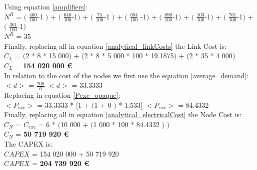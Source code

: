 Using equation \ref{amplifiers}:\\

$N^R$ = $($ $\frac{460}{100}$-1 $)$ + $($ $\frac{640}{100}$-1$)$ + $($ $\frac{75}{100}$-1 $)$ + $($ $\frac{684}{100}$ -1$)$ + $($ $\frac{890}{100}$-1$)$ + $($ $\frac{103}{100}$-1$)$ + $($ $\frac{761}{100}$-1$)$ + $($ $\frac{361}{100}$-1$)$\\

$N^R$ = 35\\

Finally, replacing all in equation \ref{analytical_linkCosts} the Link Cost is:\\

$C_L$ = $($2 * 8 * 15 000$)$ + $($2 * 8 * 5 000 * 100 * 19.1875$)$ + $($2 * 35 * 4 000$)$\\

$C_L$ = \textbf{154 020 000 \euro}\\

In relation to the cost of the nodes we first use the equation \ref{average_demand}:\\

$<d>$ = $\frac{200}{6}$ \qquad \qquad $<d>$ = 33.3333\\

Replacing in equation \ref{Pexc_opaque}:\\

$<P_{exc}>$ = 33.3333 * $[$1 + $($1 + $0$ $)$ * 1.533$]$ \qquad \qquad $<P_{exc}>$ = 84.4332 \\

Finally, replacing all in equation \ref{analytical_electricalCost} the Node Cost is:\\

$C_N$ = $C_{exc}$ = 6 * $($10 000 + $($1 000 * 100 * 84.4332 $)$ $)$\\

$C_N$ = \textbf{50 719 920 \euro}\\

The CAPEX is:\\
$CAPEX$ = 154 020 000 + 50 719 920\\

$CAPEX$ = \textbf{204 739 920 \euro}\\

